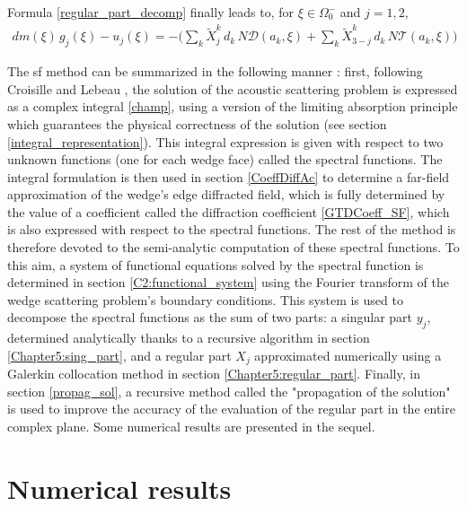 Formula \eqref{regular_part_decomp} finally leads to, for $\xi \in \Omega_0^-$ and $j=1,2$,
\begin{eqnarray}
dm(\xi)\, g_j(\xi) -  u_j(\xi)=
-\Big( \sum_k \tilde X_j^{k}\, d_k \, N\mathcal D(a_k,\xi)+\sum_k \tilde X_{3-j}^{k} \, d_k \,
N\mathcal T(a_k,\xi) \Big) \nonumber
\end{eqnarray}

The \acrfull{sf} method can be summarized in the following manner : first, following Croisille and Lebeau \cite{CroisilleLebeau}, the solution of the acoustic scattering problem is expressed as a complex integral \eqref{champ}, using a version of the limiting absorption principle which guarantees the physical correctness of the solution (see section \ref{integral_representation}). This integral expression is given with respect to two unknown functions (one for each wedge face) called the spectral functions. The integral formulation is then used in section \ref{CoeffDiffAc} to determine a far-field approximation of the wedge's edge diffracted field, which is fully determined by the value of a coefficient called the diffraction coefficient \eqref{GTDCoeff_SF}, which is also expressed with respect to the spectral functions. The rest of the method is therefore devoted to the semi-analytic computation of these spectral functions. To this aim, a system of functional equations solved by the spectral function is determined in section \ref{C2:functional_system} using the Fourier transform of the wedge scattering problem's boundary conditions. This system is used to decompose the spectral functions as the sum of two parts: a singular part $y_j$, determined analytically thanks to a recursive algorithm in section \ref{Chapter5:sing_part}, and a regular part $X_j$ approximated numerically using a Galerkin collocation method in section \ref{Chapter5:regular_part}. Finally, in section \ref{propag_sol}, a recursive method called the "propagation of the solution" is used to improve the accuracy of the evaluation of the regular part in the entire complex plane. Some numerical results are presented in the sequel.

\section{Numerical results}
\label{Chapter5:results}

